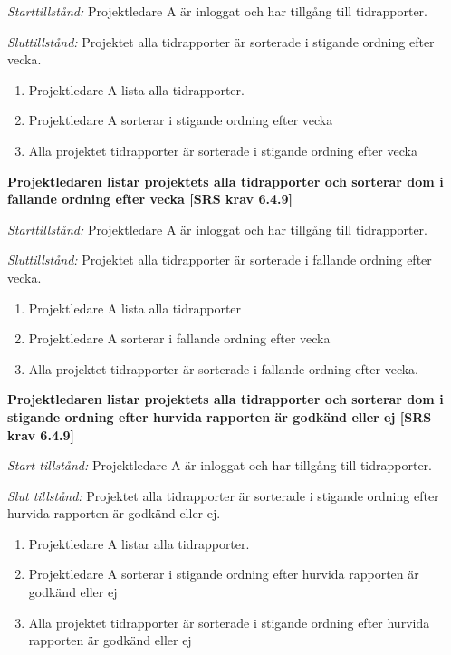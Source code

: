\documentclass[a4paper]{article}
\begin{document}
\begin{FT}
\emph{Starttillstånd:} Projektledare A är inloggat och har tillgång till tidrapporter.

\emph{Sluttillstånd:} Projektet alla tidrapporter är sorterade i stigande ordning efter vecka.

\begin{enumerate}
\item Projektledare A lista alla tidrapporter.
\item Projektledare A sorterar i stigande ordning efter vecka
\item Alla projektet tidrapporter är sorterade i stigande ordning efter vecka
\end{enumerate}

\item %
\textbf{Projektledaren listar projektets alla tidrapporter och sorterar dom i fallande ordning efter vecka [SRS krav 6.4.9]} 

\emph{Starttillstånd:} Projektledare A är inloggat och har tillgång till tidrapporter.

\emph{Sluttillstånd:} Projektet alla tidrapporter är sorterade i fallande ordning efter vecka.

\begin{enumerate}
\item Projektledare A lista alla tidrapporter
\item Projektledare A sorterar i fallande ordning efter vecka
\item Alla projektet tidrapporter är sorterade i fallande ordning efter vecka.
\end{enumerate}

\item %
\textbf{Projektledaren listar projektets alla tidrapporter och sorterar dom i stigande ordning efter hurvida rapporten är godkänd eller ej [SRS krav 6.4.9]}

\emph{Start tillstånd:} Projektledare A är inloggat och har tillgång till tidrapporter.

\emph{Slut tillstånd:} Projektet alla tidrapporter är sorterade i stigande ordning efter hurvida rapporten är godkänd eller ej.

\begin{enumerate}
\item Projektledare A listar alla tidrapporter.
\item Projektledare A sorterar i stigande ordning efter hurvida rapporten är godkänd eller ej
\item Alla projektet tidrapporter är sorterade i stigande ordning efter hurvida rapporten är godkänd eller ej
\end{enumerate}


\end{FT}
\end{document}
